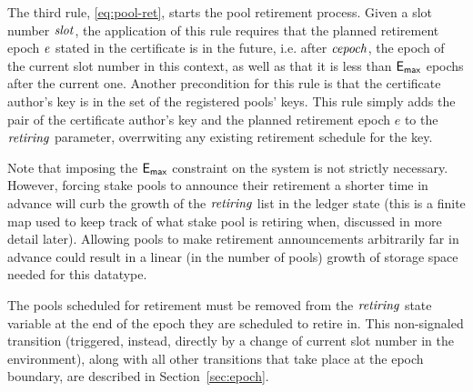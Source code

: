 The third rule, \cref{eq:pool-ret}, starts the pool retirement process. Given a
slot number $\mathit{slot}$, the application of this rule requires that the
planned retirement epoch $\mathit{e}$ stated in the certificate is in the future,
i.e. after
$\mathit{cepoch}$, the epoch of the current slot number in this context, as well as
that it is
less than $\mathsf{E_{max}}$ epochs after the current one. Another precondition for this
rule is that
the certificate author's key is in the set of the registered pools' keys.
This rule simply adds the pair of the
certificate author's key and the planned retirement epoch $e$ to the $\mathit{retiring}$
parameter, overrwiting any existing retirement schedule for the key.

Note that imposing the $\mathsf{E_{max}}$ constraint on the system is not strictly necessary.
However, forcing stake pools to announce their retirement a shorter time in
advance will curb the growth of the $\mathit{retiring}$ list in the ledger state
(this is a finite map used to keep track of what stake pool is retiring when,
discussed in more detail later).
Allowing pools to make retirement announcements arbitrarily far in advance
could result in a linear (in the number of pools) growth of storage space needed
for this datatype.

The pools scheduled for retirement must be removed from
the $\mathit{retiring}$ state variable at the end of the epoch they are scheduled
to retire in. This non-signaled transition (triggered, instead, directly by a
change of current slot number in the environment), along with all other transitions
that take place at the epoch boundary, are described in Section~\ref{sec:epoch}.


